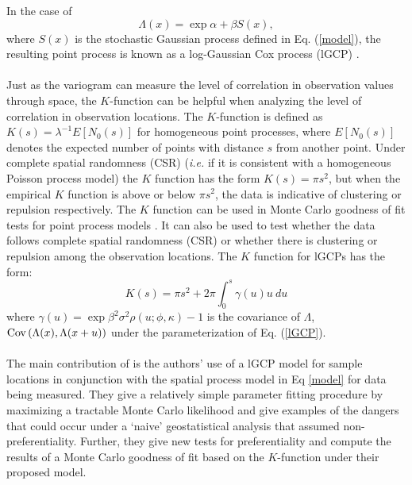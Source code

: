 \documentclass{uwstat572}
\begin{document}
In the case of
\begin{equation}
\Lambda(x) = \exp{\alpha + \beta S(x)},
\label{lGCP}
\end{equation}
where $S(x)$ is the stochastic Gaussian process defined in Eq. (\ref{model}), the resulting point process is known as a log-Gaussian Cox process (lGCP) \citep{diggle2010}.
\\\\
Just as the variogram can measure the level of correlation in observation values through space, the $K$-function can be helpful when analyzing the level of correlation in observation locations.  The $K$-function is defined as $K(s) = \lambda^{-1} E[N_0(s)]$ for homogeneous point processes, where $E[N_0(s)]$ denotes the expected number of points with distance $s$ from another point.  Under complete spatial randomness (CSR) (\emph{i.e.} if it is consistent with a homogeneous Poisson process model) the $K$ function has the form $K(s) = \pi s^2$, but when the empirical $K$ function is above or below $\pi s^2$, the data is indicative of clustering or repulsion respectively.  The $K$ function can be used in Monte Carlo goodness of fit tests for point process models \citep[Section 18.3]{handbook}.  It can also be used to test whether the data follows complete spatial randomness (CSR) or whether there is clustering or repulsion among the observation locations.  The $K$ function for lGCPs has the form:
\begin{equation}
K(s) = \pi s^2 + 2 \pi \int_0^s \gamma(u) u \ du
\label{Kfun}
\end{equation}
where $\gamma(u) = \exp{\beta^2 \sigma^2 \rho(u ; \phi, \kappa)} - 1$ is the covariance of $\Lambda$, $\text{Cov}\left(\Lambda(x), \Lambda(x + u)\right)$ under the parameterization of Eq. (\ref{lGCP}).
\\\\
The main contribution of \citet{diggle2010} is the authors' use of a lGCP model for sample locations in conjunction with the spatial process model in Eq \ref{model} for data being measured.  They give a relatively simple parameter fitting procedure by maximizing a tractable Monte Carlo likelihood and give examples of the dangers that could occur under a `naive' geostatistical analysis that assumed non-preferentiality.  Further, they give new tests for preferentiality and compute the results of a Monte Carlo goodness of fit based on the $K$-function under their proposed model.

%

\end{document}
